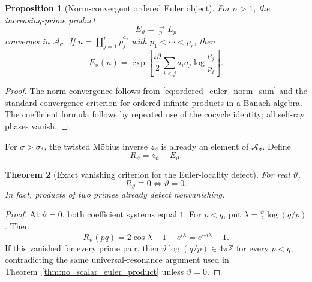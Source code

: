 \documentclass[11pt]{amsart}
\numberwithin{equation}{section}
\theoremstyle{plain}
\newtheorem{theorem}{Theorem}[section]
\newtheorem{proposition}[theorem]{Proposition}
\theoremstyle{definition}
\theoremstyle{remark}
\begin{document}
\begin{proposition}[Norm-convergent ordered Euler object]
\label{prop:ordered_euler_object}
For \(\sigma>1\), the increasing-prime product
\begin{equation}
\boxed{
E_\vartheta
=
\mathop{\star_\vartheta}_{p}^{\longrightarrow}L_p
}
\label{eq:Etheta_ordered_product}
\end{equation}
converges in \(\mathcal A_\sigma\).  If
\(n=\prod_{j=1}^r p_j^{a_j}\) with \(p_1<\cdots<p_r\), then
\begin{equation}
\boxed{
E_\vartheta(n)
=
\exp\!\left[
\frac{i\vartheta}{2}
\sum_{i<j}a_i a_j\log\frac{p_j}{p_i}
\right].}
\label{eq:Etheta_coefficient}
\end{equation}
\end{proposition}

\begin{proof}
The norm convergence follows from
\eqref{eq:ordered_euler_norm_sum} and the standard convergence criterion for
ordered infinite products in a Banach algebra.  The coefficient formula
follows by repeated use of the cocycle identity; all self-ray phases vanish.
\end{proof}

For \(\sigma>\sigma_*\), the twisted M\"obius inverse \(z_\vartheta\) is
already an element of \(\mathcal A_\sigma\).  Define
\begin{equation}
\boxed{R_\vartheta=z_\vartheta-E_\vartheta.}
\label{eq:Rtheta_def}
\end{equation}

\begin{theorem}[Exact vanishing criterion for the Euler-locality defect]
\label{thm:Rtheta_vanishing}
For real \(\vartheta\),
\begin{equation}
\boxed{R_\vartheta\equiv0\iff\vartheta=0.}
\label{eq:Rtheta_vanishing}
\end{equation}
In fact, products of two primes already detect nonvanishing.
\end{theorem}

\begin{proof}
At \(\vartheta=0\), both coefficient systems equal \(1\).
For \(p<q\), put
\(\lambda=\frac{\vartheta}{2}\log(q/p)\).  Then
\begin{equation}
R_\vartheta(pq)
=
2\cos\lambda-1-e^{i\lambda}
=
e^{-i\lambda}-1.
\label{eq:Rtheta_pq}
\end{equation}
If this vanished for every prime pair, then
\(\vartheta\log(q/p)\in4\pi\mathbb Z\) for every \(p<q\), contradicting the
same universal-resonance argument used in
Theorem~\ref{thm:no_scalar_euler_product} unless \(\vartheta=0\).
\end{proof}
\end{document}
